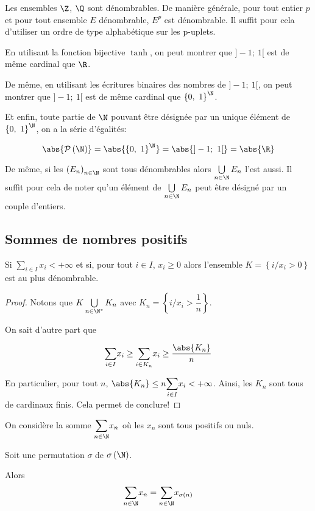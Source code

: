 Les ensembles $\Z$, $\Q$ sont dénombrables. De manière générale, pour tout entier $p$ et pour tout ensemble $E$ dénombrable, $E^p$ est dénombrable. Il suffit pour cela d'utiliser un ordre de type alphabétique sur les p-uplets.

En utilisant la fonction bijective $\tanh$, on peut montrer que $]-1;~1[$ est de même cardinal que $\R$.

De même, en utilisant les écritures binaires des nombres de $]-1;~1[$, on peut montrer que $]-1;~1[$ est de même cardinal que $\left \{ 0,~1\right\}^{\N}$.

Et enfin, toute partie de $\N$ pouvant être désignée par un unique élément de $\left \{ 0,~1\right\}^{\N}$, on a la série d'égalités:

\[
\abs{\mathcal{P}\left(\N\right)} = \abs{\left \{ 0,~1\right\}^{\N}} = \abs{]-1;~1[} = \abs{\R}
\]

De même, si les $\left(E_n\right)_{n \in \N}$ sont tous dénombrables alors $\bigcup \limits_{n \in \N} E_n$ l'est aussi. Il suffit pour cela de noter qu'un élément de $\bigcup \limits_{n \in \N} E_n$ peut être désigné par un couple d'entiers.

\subsection{Sommes de nombres positifs}

\begin{prop}
Si $\displaystyle{\sum \limits_{i \in I}} x_i < +\infty$ et si, pour tout $i \in I$, $x_i \geq 0$ alors l'ensemble $K = \left\{ i / x_i>0\right\}$ est au plus dénombrable.
\end{prop}

\begin{proof}
Notons que $K \bigcup \limits_{n \in \N^{*}} K_n$ avec $K_n = \left\{ i / x_i > \dfrac{1}{n}\right\}$.

On sait d'autre part que 

\[
\displaystyle{\sum \limits_{i \in I}} x_i \geq \displaystyle{\sum \limits_{i \in K_n}} x_i \geq \dfrac{\abs{K_n}}{n}
\]

En particulier, pour tout $n$, $\abs{K_n} \leq n \displaystyle{\sum \limits_{i \in I}} x_i < +\infty$. Ainsi, les $K_n$ sont tous de cardinaux finis. Cela permet de conclure!
\end{proof}

\begin{prop}

On considère la somme $\displaystyle{\sum \limits_{n \in \N}} x_n$ où les $x_n$ sont tous positifs ou nuls.

Soit une permutation $\sigma$ de $\displaystyle{\sigma}\left(\N\right)$.

Alors 
\[\displaystyle{\sum \limits_{n \in \N}} x_n = \displaystyle{\sum \limits_{n \in \N}} x_{\sigma(n)}\]
\end{prop}

